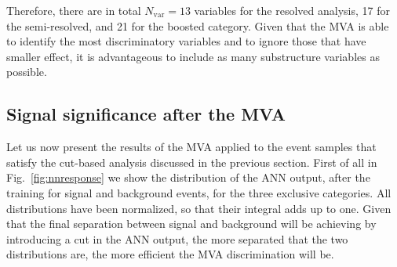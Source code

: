 %
Therefore, there are in total $N_{\mathrm{var}}=13$ variables for the resolved analysis,
17 for the semi-resolved, and 21 for the boosted category.
%
Given that the MVA is able to identify the most discriminatory variables
and to ignore those that have smaller effect, it is advantageous to
include as many substructure variables as possible.
%

\subsection{Signal significance after the MVA}

Let us now present the results of the MVA applied to the event samples
that satisfy the cut-based analysis discussed in the previous section.
%
First of all in Fig.~\ref{fig:nnresponse} we show the distribution of
the ANN output, after the training for signal and background events, for the three
exclusive categories.
%
All distributions have been normalized, so that their integral
  adds up to one.
%
Given that the final separation between signal and background will be achieving by introducing
a cut in the ANN output, the more separated that the two distributions are, the more efficient
the MVA discrimination will be.



